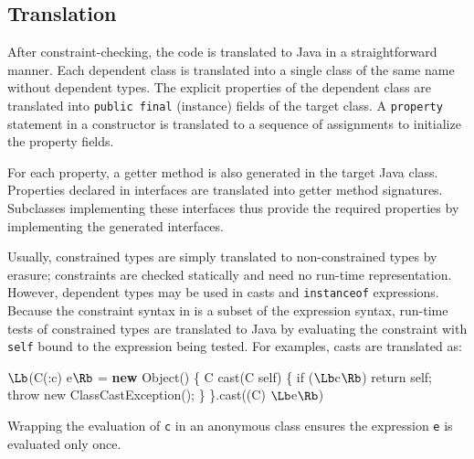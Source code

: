 


\subsection{Translation}

After constraint-checking, the \Xten{} code is translated to
Java in a straightforward manner.  Each dependent class
is translated into a single class of the same name without dependent
types. The explicit properties of the dependent class are translated
into {\tt public final} (instance) fields of the target class.
A {\tt property} statement in a constructor is translated to a
sequence of assignments to initialize the property fields.

For each property, a getter method is also generated in the
target Java class.
Properties declared in interfaces are translated into getter
method signatures.  Subclasses implementing these interfaces
thus provide the required properties by implementing the
generated interfaces.

Usually, constrained types are simply translated to
non-constrained types by erasure; constraints are checked
statically and need no run-time representation.
However, dependent types may be used in casts
and {\tt instanceof} expressions.  Because the constraint syntax
in \Xten{} is a subset of the \Xten{} expression syntax, run-time tests
of constrained types are translated to Java
by evaluating the constraint with
{\tt self} bound to the expression being tested.
For examples, casts are translated as:
\begin{code}
  $\Lb$(C(:c) e$\Rb$ = 
    {\bf new} Object() \{
      C cast(C self) \{
        if ($\Lb$c$\Rb$) return self;
        throw new ClassCastException(); \}
    \}.cast((C) $\Lb$e$\Rb$)
\end{code}
\noindent Wrapping the evaluation of {\tt c} in an anonymous class
ensures the expression {\tt e} is evaluated only once.

